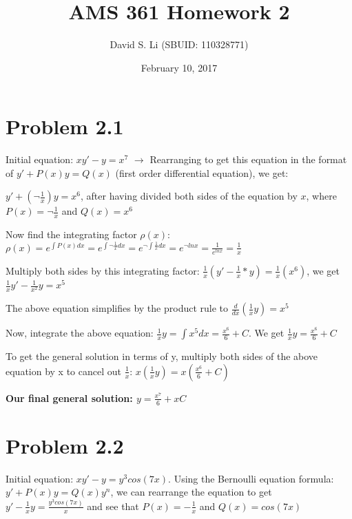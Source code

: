 \documentclass{article}
\title{AMS 361 Homework 2}
\author{David S. Li (SBUID: 110328771)}
\date{February 10, 2017}
\begin{document}
\maketitle

\section{Problem 2.1}
\noindent Initial equation: $xy' - y = x^{7}$ $\rightarrow$ Rearranging to get this equation in the format of $y' + P(x)y = Q(x)$ (first order differential equation), we get: \par\noindent

\noindent $y' + (\neg\frac{1}{x})y = x^{6}$, after having divided both sides of the equation by $x$, where $P(x) = \neg\frac{1}{x}$ and $Q(x) = x^{6}$ \par\vspace{0.25cm}
\noindent Now find the integrating factor $\rho(x)$: $\rho(x) = e^{\int P(x)dx} = e^{\int \neg\frac{1}{x} dx} = e^{\neg\int \frac{1}{x} dx} = e^{\neg lnx} = \frac{1}{e^{lnx}} = \frac{1}{x}$ \par\vspace{0.25cm}

\noindent Multiply both sides by this integrating factor: $\frac{1}{x}(y' - \frac{1}{x}*y) = \frac{1}{x}(x^{6})$, we get $\frac{1}{x}y' - \frac{1}{x^{2}}y = x^{5}$ \par
\noindent  The above equation simplifies by the product rule to $\frac{d}{dx}(\frac{1}{x}y) = x^{5}$ \par\vspace{0.25cm}

\noindent Now, integrate the above equation: $\frac{1}{x}y = \int x^{5} dx = \frac{x^{6}}{6} + C$.  We get $\frac{1}{x}y = \frac{x^{6}}{6} + C$ \par
\noindent To get the general solution in terms of y, multiply both sides of the above equation by x to cancel out $\frac{1}{x}$: $x(\frac{1}{x}y) = x(\frac{x^{6}}{6} + C)$ \par\vspace{0.25cm}
\noindent \textbf{Our final general solution: $y = \frac{x^{7}}{6} + xC$}

\section{Problem 2.2}

\noindent Initial equation: $xy' - y = y^{3}cos(7x)$.  Using the Bernoulli equation formula: $y' + P(x)y = Q(x)y^{n}$, we can rearrange the equation to get $y' - \frac{1}{x}y = \frac{y^{3}cos(7x)}{x}$ and see that $P(x) = -\frac{1}{x}$ and $Q(x) = cos(7x)$ \par\vspace{0.25cm}
\end{document}
